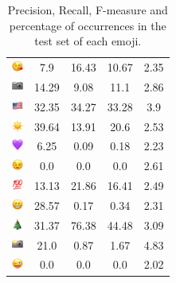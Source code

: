\documentclass{article}
\begin{document}
\begin{table}
\begin{tabular}{|c|ccc|c|}
\includegraphics[height=0.37cm,width=0.37cm]{img/face_blowing_a_kiss.png} & 7.9 & 16.43 & 10.67 & 2.35\\ 
\includegraphics[height=0.37cm,width=0.37cm]{img/camera.png} & 14.29 & 9.08 & 11.1 & 2.86\\ 
\includegraphics[height=0.37cm,width=0.37cm]{img/United_States.png} & 32.35 & 34.27 & 33.28 & 3.9\\ 
\includegraphics[height=0.37cm,width=0.37cm]{img/sun.png} & 39.64 & 13.91 & 20.6 & 2.53\\ 
\includegraphics[height=0.37cm,width=0.37cm]{img/purple_heart.png} & 6.25 & 0.09 & 0.18 & 2.23\\ 
\includegraphics[height=0.37cm,width=0.37cm]{img/winking_face.png} & 0.0 & 0.0 & 0.0 & 2.61\\ 
\includegraphics[height=0.37cm,width=0.37cm]{img/hundred_points.png} & 13.13 & 21.86 & 16.41 & 2.49\\ 
\includegraphics[height=0.37cm,width=0.37cm]{img/beaming_face_with_smiling_eyes.png} & 28.57 & 0.17 & 0.34 & 2.31\\ 
\includegraphics[height=0.37cm,width=0.37cm]{img/Christmas_tree.png} & 31.37 & 76.38 & 44.48 & 3.09\\ 
\includegraphics[height=0.37cm,width=0.37cm]{img/camera_with_flash.png} & 21.0 & 0.87 & 1.67 & 4.83\\ 
\includegraphics[height=0.37cm,width=0.37cm]{img/winking_face_with_tongue.png} & 0.0 & 0.0 & 0.0 & 2.02\\ 

\hline
\end{tabular}
\caption{\label{table:emoji_detailed} Precision, Recall, F-measure and percentage of occurrences in the test set of each emoji.}
\end{table}
\end{document}
